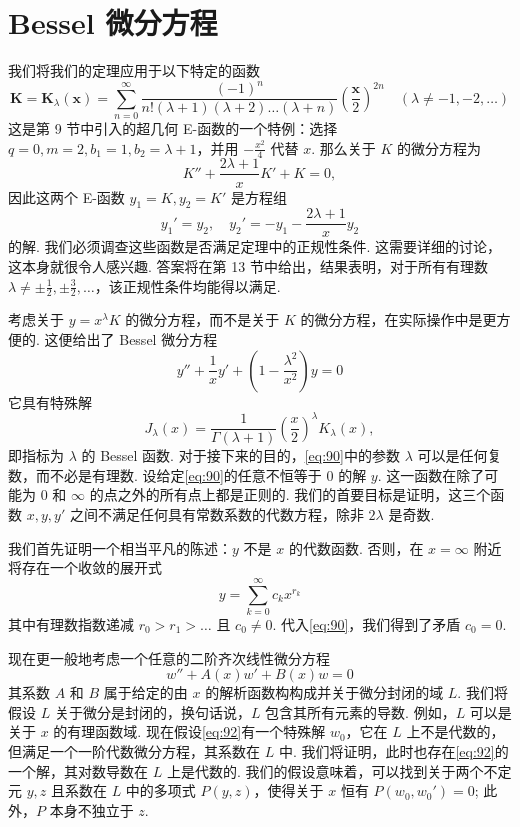 \section{Bessel 微分方程}

我们将我们的定理应用于以下特定的函数
\begin{equation}
\mathbf{K} = \mathbf{K}_{\lambda} (\mathbf{x}) = \sum_{n=0}^{\infty} \frac{(-1)^n}{n! (\lambda + 1)(\lambda + 2) \dots (\lambda + n)} \left(\frac{\mathbf{x}}{2}\right)^{2n} \quad (\lambda \neq -1, -2, \dots) \tag{89}\label{eq:89}
\end{equation}
这是第 9 节中引入的超几何 E-函数的一个特例：选择 $q=0, m=2, b_1=1, b_2=\lambda+1$，并用 $-\frac{x^2}{4}$ 代替 $x$. 那么关于 $K$ 的微分方程为
\[K'' + \frac{2\lambda + 1}{x} K' + K = 0,\]
因此这两个 E-函数 $y_1 = K, y_2 = K'$ 是方程组
\[y_1' = y_2, \quad y_2' = -y_1 - \frac{2\lambda + 1}{x} y_2\]
的解. 我们必须调查这些函数是否满足定理中的正规性条件. 这需要详细的讨论，这本身就很令人感兴趣. 答案将在第 13 节中给出，结果表明，对于所有有理数 $\lambda \neq \pm \frac{1}{2}, \pm \frac{3}{2}, \dots$，该正规性条件均能得以满足.

考虑关于 $y = x^\lambda K$ 的微分方程，而不是关于 $K$ 的微分方程，在实际操作中是更方便的. 这便给出了 Bessel 微分方程
\begin{equation}
y'' + \frac{1}{x} y' + \left(1 - \frac{\lambda^2}{x^2}\right)y = 0 \tag{90}\label{eq:90}
\end{equation}
它具有特殊解
\begin{equation}
J_{\lambda}(x) = \frac{1}{\Gamma(\lambda+1)} \left(\frac{x}{2}\right)^{\lambda} K_{\lambda}(x), \tag{91}\label{eq:91}
\end{equation}
即指标为 $\lambda$ 的 Bessel 函数. 对于接下来的目的，\eqref{eq:90}中的参数 $\lambda$ 可以是任何复数，而不必是有理数. 设给定\eqref{eq:90}的任意不恒等于 0 的解 $y$. 这一函数在除了可能为 $0$ 和 $\infty$ 的点之外的所有点上都是正则的. 我们的首要目标是证明，这三个函数 $x, y, y'$ 之间不满足任何具有常数系数的代数方程，除非 $2\lambda$ 是奇数.

我们首先证明一个相当平凡的陈述：$y$ 不是 $x$ 的代数函数. 否则，在 $x=\infty$ 附近将存在一个收敛的展开式
\[y = \sum_{k=0}^{\infty} c_k x^{r_k}\]
其中有理数指数递减 $r_0 > r_1 > \dots$ 且 $c_0 \neq 0$. 代入\eqref{eq:90}，我们得到了矛盾 $c_0=0$.

现在更一般地考虑一个任意的二阶齐次线性微分方程
\begin{equation}
w'' + A(x)w' + B(x)w = 0 \tag{92}\label{eq:92}
\end{equation}
其系数 $A$ 和 $B$ 属于给定的由 $x$ 的解析函数构构成并关于微分封闭的域 $L$. 我们将假设 $L$ 关于微分是封闭的，换句话说，$L$ 包含其所有元素的导数. 例如，$L$ 可以是关于 $x$ 的有理函数域. 现在假设\eqref{eq:92}有一个特殊解 $w_0$，它在 $L$ 上不是代数的，但满足一个一阶代数微分方程，其系数在 $L$ 中. 我们将证明，此时也存在\eqref{eq:92}的一个解，其对数导数在 $L$ 上是代数的. 我们的假设意味着，可以找到关于两个不定元 $y,z$ 且系数在 $L$ 中的多项式 $P(y,z)$，使得关于 $x$ 恒有 $P(w_0, w_0') = 0$; 此外，$P$ 本身不独立于 $z$.

